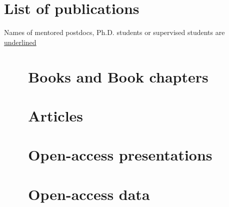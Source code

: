 \documentclass[%
               doublesided,
               paper=a4,
               fontsize=10pt
              ]{my-resume}
\begin{document}
\clearpage

\pagestyle{empty}

\section[\faAreaChart]{List of publications}
Names of mentored postdocs, Ph.D. students or supervised students are \underline{underlined}

\nocite{*}
\section{\faBook \ \ \ Books and Book chapters}
\printbibliography[type=book,heading=none]
\section{\faFileTextO \ \ \  Articles}
\printbibliography[type=article,heading=none]
\section{\faFileTextO \ \ \  Open-access presentations}
\printbibliography[type=misc,heading=none]
\section{\faFileTextO \ \ \  Open-access data}
\printbibliography[type=dataset,heading=none]


\end{document}
